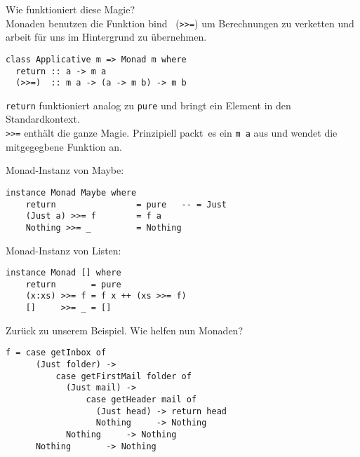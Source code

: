 \documentclass{beamer}
\begin{document}
\begin{frame}[fragile]
Wie funktioniert diese Magie?\\
\pause
Monaden benutzen die Funktion \glqq bind \grqq \ (\texttt{>>=}) um Berechnungen zu verketten und arbeit für uns im Hintergrund zu übernehmen.\\
\pause
\begin{verbatim}
class Applicative m => Monad m where
  return :: a -> m a
  (>>=)  :: m a -> (a -> m b) -> m b
\end{verbatim}
\pause
\texttt{return} funktioniert analog zu \texttt{pure} und bringt ein Element in den Standardkontext.\\
\texttt{>>=} enthält die ganze Magie. Prinzipiell \glqq packt\grqq \ es ein \texttt{m a} aus und wendet die mitgegegbene Funktion an.
\end{frame}

\begin{frame}[fragile]
Monad-Instanz von Maybe:
\begin{verbatim}
instance Monad Maybe where
    return                = pure   -- = Just
    (Just a) >>= f        = f a
    Nothing >>= _         = Nothing
\end{verbatim}
\begin{comment}
\pause
Monad-Instanz von Either:
\begin{verbatim}
instance Monad Either where
    return                = pure   -- = Right
    (Right e) >>= f       = f e
    (Left e)  >>= _       = Left e
\end{verbatim}
\end{comment}
\pause
Monad-Instanz von Listen:
\begin{verbatim}
instance Monad [] where
    return       = pure
    (x:xs) >>= f = f x ++ (xs >>= f)
    []     >>= _ = []
\end{verbatim}
\end{frame}

\begin{frame}[fragile]
Zurück zu unserem Beispiel. Wie helfen nun Monaden?
\pause
\begin{verbatim}
f = case getInbox of
      (Just folder) -> 
          case getFirstMail folder of
            (Just mail) -> 
                case getHeader mail of
                  (Just head) -> return head
                  Nothing     -> Nothing
            Nothing     -> Nothing
      Nothing       -> Nothing
\end{verbatim}
\end{frame}
\end{document}
